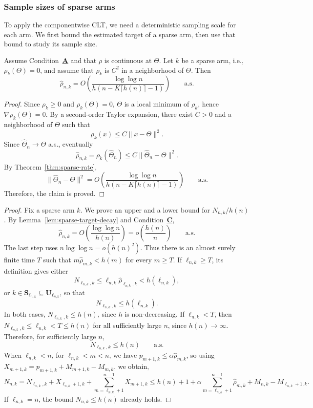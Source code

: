 \subsubsection{Sample sizes of sparse arms}
{\color{revisiongreen}To apply the componentwise CLT, we need a deterministic sampling scale for each arm. We first bound the estimated target of a sparse arm, then use that bound to study its sample size.
	\begin{lemma}
		\label{lem:sparse-target-decay}
		Assume Condition~\hyperlink{CA}{\textbf{A}} and that \(\rho\) is continuous at \(\Theta\). Let $k$ be a sparse arm, i.e., $\rho_k(\Theta)=0$, and assume that
		$\rho_k$ is $C^2$ in a neighborhood of $\Theta$. Then
		\[
		\widehat\rho_{n,k}
		=O\!\left(\frac{\log\log n}{h\!\left(n-K\lceil h(n)\rceil-1\right)}\right)
		\qquad \text{a.s.}
		\]
	\end{lemma}
	
	\begin{proof}
		Since $\rho_k\geq0$ and $\rho_k(\Theta)=0$, $\Theta$ is a local
		minimum of $\rho_k$, hence $\nabla\rho_k(\Theta)=0$. By a second-order
		Taylor expansion, there exist $C>0$ and a neighborhood of $\Theta$
		such that
		\[
		\rho_k(x)\leq C\|x-\Theta\|^2.
		\]
		Since $\widehat\Theta_n\to\Theta$ a.s., eventually
		\[
		\widehat\rho_{n,k}
		=\rho_k(\widehat\Theta_n)
		\leq C\|\widehat\Theta_n-\Theta\|^2.
		\]		
		By Theorem~\ref{thm:sparse-rate},
		\[
		\|\hat\Theta_n-\Theta\|^2
		=O\!\left(\frac{\log\log n}{h\!\left(n-K\lceil h(n)\rceil-1\right)}\right)
		\qquad\text{a.s.}
		\]
		Therefore, the claim is proved.		
	\end{proof}
	\sparsestability*	
	\begin{proof}
{\color{revisiongreen}
Fix a sparse arm \(k\). We prove an upper and a lower bound for \(N_{n,k}/h(n)\). By Lemma~\ref{lem:sparse-target-decay} and Condition~\hyperlink{CC}{\textbf{C}},
\[
\hat\rho_{n,k}=O\!\left(\frac{\log\log n}{h(n)}\right)
=o\!\left(\frac{h(n)}n\right)\qquad\text{a.s.}
\]
The last step uses \(n\log\log n=o(h(n)^2)\). Thus there is an almost surely finite time \(T\) such that \(m\hat\rho_{m,k}<h(m)\) for every \(m\geq T\). If \(\ell_{n,k}\geq T\), its definition gives either
\[
N_{\ell_{n,k},k}\leq\ell_{n,k}\hat\rho_{\ell_{n,k},k}<h(\ell_{n,k}),
\]
or \(k\in\mathbf S_{\ell_{n,k}}\subseteq\mathbf U_{\ell_{n,k}}\), so that
\[
N_{\ell_{n,k},k}\leq h(\ell_{n,k}).
\]
In both cases, \(N_{\ell_{n,k},k}\leq h(n)\), since \(h\) is non-decreasing. If \(\ell_{n,k}<T\), then \(N_{\ell_{n,k},k}\leq\ell_{n,k}<T\leq h(n)\) for all sufficiently large \(n\), since \(h(n)\to\infty\). Therefore, for sufficiently large \(n\),
\[
N_{\ell_{n,k},k}\leq h(n)\qquad\text{a.s.}
\]
When \(\ell_{n,k}<n\), for \(\ell_{n,k}<m<n\), we have 
\(
p_{m+1,k}\leq\alpha\hat\rho_{m,k}
\), so using \(X_{m+1,k}=p_{m+1,k}+M_{m+1,k}-M_{m,k}\), we obtain, 
\[
N_{n,k} = N_{\ell_{n,k},k}+X_{\ell_{n,k}+1,k}+\sum_{m=\ell_{n,k}+1}^{n-1}X_{m+1,k}
\leq h(n)+1+\alpha\sum_{m=\ell_{n,k}+1}^{n-1}\hat\rho_{m,k}
+M_{n,k}-M_{\ell_{n,k}+1,k}.
\]
If \(\ell_{n,k}=n\), the bound \(N_{n,k}\leq h(n)\) already holds.

}
\end{proof}}
